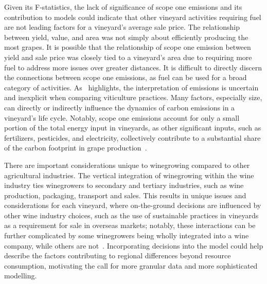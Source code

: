 \documentclass[10pt,letterpaper]{article}
\begin{document}
Given its F-statistics, the lack of significance of scope one emissions and its contribution to models could indicate that other vineyard activities requiring fuel are not leading factors for a vineyard's average sale price. The relationship between yield, value, and area was not simply about efficiently producing the most grapes. It is possible that the relationship of scope one emission between yield and sale price was closely tied to a vineyard's area due to requiring more fuel to address more issues over greater distances. It is difficult to directly discern the connections between scope one emissions, as fuel can be used for a broad category of activities. As~\cite{rugani2013carbon} highlights, the interpretation of emissions is uncertain and inexplicit when comparing viticulture practices. Many factors, especially size, can directly or indirectly influence the dynamics of carbon emissions in a vineyard's life cycle. Notably, scope one emissions account for only a small portion of the total energy input in vineyards, as other significant inputs, such as fertilizers, pesticides, and electricity, collectively contribute to a substantial share of the carbon footprint in grape production~\cite{point2012life}.
\par
There are important considerations unique to winegrowing compared to other agricultural industries. The vertical integration of winegrowing within the wine industry ties winegrowers to secondary and tertiary industries, such as wine production, packaging, transport and sales. This results in unique issues and considerations for each vineyard, where on-the-ground decisions are influenced by other wine industry choices, such as the use of sustainable practices in vineyards as a requirement for sale in overseas markets; notably, these interactions can be further complicated by some winegrowers being wholly integrated into a wine company, while others are not~\cite{knightFirmResourcesDevelopment2019}. Incorporating decisions into the model could help describe the factors contributing to regional differences beyond resource consumption, motivating the call for more granular data and more sophisticated modelling.
\par
\end{document}
